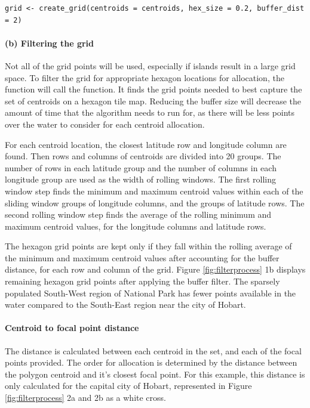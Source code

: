 \begin{verbatim}
grid <- create_grid(centroids = centroids, hex_size = 0.2, buffer_dist = 2)
\end{verbatim}

\hypertarget{b-filtering-the-grid}{%
\paragraph{(b) Filtering the grid}\label{b-filtering-the-grid}}

Not all of the grid points will be used, especially if islands result in a large grid space. To filter the grid for appropriate hexagon locations for allocation, the  function will call the  function. It finds the grid points needed to best capture the set of centroids on a hexagon tile map. Reducing the buffer size will decrease the amount of time that the algorithm needs to run for, as there will be less points over the water to consider for each centroid allocation.

For each centroid location, the closest latitude row and longitude column are found. Then rows and columns of centroids are divided into 20 groups. The number of rows in each latitude group and the number of columns in each longitude group are used as the width of rolling windows. The first rolling window step finds the minimum and maximum centroid values within each of the sliding window groups of longitude columns, and the groups of latitude rows. The second rolling window step finds the average of the rolling minimum and maximum centroid values, for the longitude columns and latitude rows.

The hexagon grid points are kept only if they fall within the rolling average of the minimum and maximum centroid values after accounting for the buffer distance, for each row and column of the grid. Figure \ref{fig:filterprocess} 1b displays remaining hexagon grid points after applying the buffer filter. The sparsely populated South-West region of National Park has fewer points available in the water compared to the South-East region near the city of Hobart.

\hypertarget{centroid-to-focal-point-distance}{%
\paragraph{Centroid to focal point distance}\label{centroid-to-focal-point-distance}}

The distance is calculated between each centroid in the set, and each of the focal points provided. The order for allocation is determined by the distance between the polygon centroid and it's closest focal point. For this example, this distance is only calculated for the capital city of Hobart, represented in Figure \ref{fig:filterprocess} 2a and 2b as a white cross.

